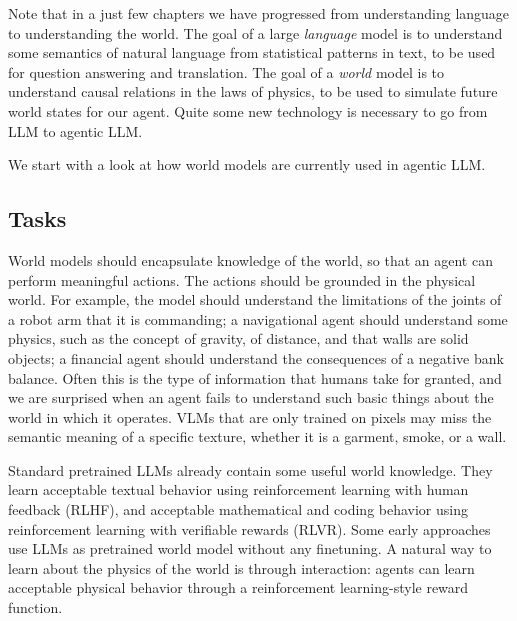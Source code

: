 Note that in a just few chapters we have progressed from  understanding language to understanding the world. The goal of a large {\em language} model is to understand some semantics of natural language from statistical patterns in text, to be used for question answering and translation. The goal of a {\em world} model  is to understand causal relations in the laws of physics, to be used to simulate future world states for our agent. Quite some new technology is necessary to go from LLM to agentic LLM. 


We start with a look at how world models are currently used in agentic LLM.

\subsection{Tasks}
World models should encapsulate knowledge of the world, so that an agent can perform meaningful actions. The actions should be grounded in the physical world. For example, the model should understand the limitations of the joints of a robot arm that it is commanding; a navigational agent should understand some physics, such as the concept of gravity, of distance, and that walls are solid objects; a financial agent should understand the consequences of a negative bank balance. Often this is the type of information that humans take for granted, and we are surprised when an agent fails to understand such basic things about the world in which it operates. VLMs that are only trained on pixels may miss the semantic meaning of a specific texture, whether it is a garment, smoke,  or a wall. 

Standard pretrained LLMs already contain some useful world knowledge. They learn acceptable textual behavior using reinforcement learning with human feedback (RLHF), and acceptable mathematical and coding behavior using reinforcement learning with verifiable rewards (RLVR). Some early approaches use LLMs as pretrained world model without any finetuning. 
A natural way to learn about the physics of the world is  through interaction: agents can learn acceptable physical behavior through a reinforcement learning-style reward function.


